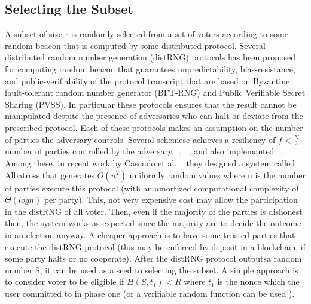 \documentclass[]{paper}
\begin{document}
\subsection{Selecting the Subset}
A  subset of size r is randomly selected from a  set of voters according to some random beacon that is computed by some distributed protocol. 
Several distributed random number generation (distRNG) protocols has been proposed for computing  random beacon that guarantees unpredictability, bias-resistance, and public-verifiability of the protocol transcript that are based on Byzantine fault-tolerant random number generator (BFT-RNG) and Public Verifiable Secret Sharing (PVSS).
In particular these protocols ensures that the result cannot be manipulated despite the presence of adversaries who can halt or deviate from the prescribed protocol. 
  Each of these protocols makes an assumption on the number of parties the adversary controls.  Several schemese achieves a resiliency of $f< \frac{N}{2}$ number of parties controlled by the adversary ~\cite{thresholdBLS}, ~\cite{SCRAP}, and also implemanted ~\cite{drand}.
Among these, in recent work by Cascudo et al.  ~\cite{} they designed a system called Albatross that generates $\Theta 	(n^2)$ uniformly random values where n is the number of parties execute this protocol (with an amortized computational complexity of $\Theta (log n)$ per party).
This, not very expensive cost may allow the participation in the distRNG of all voter. Then, even if the majority of the parties is dishonest then, the system works as expected since the majority are to decide the outcome in an election anyway. A cheaper approach is to have some trusted parties that execute the distRNG protocol (this may be enforced by deposit in a blockchain, if some party halts or no cooperate).
After the distRNG protocol outputsa  random number  S, it can be used as a seed to selecting the subset. A simple approach is to consider voter to be eligible if $H(S,t_1)<R$ where $t_1$ is the nonce which the user committed to in phase one  (or a verifiable random function can be used ).
\end{document}
